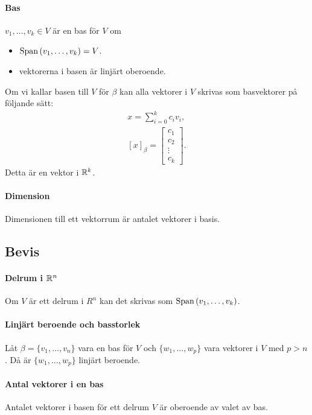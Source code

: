 \paragraph{Bas}
$v_1, \dots, v_k\in V$ är en bas för $V$ om
\begin{itemize}
	\item $\text{Span}\left(v_1, \dots, v_k\right) = V$.
	\item vektorerna i basen är linjärt oberoende.
\end{itemize}
Om vi kallar basen till $V$ för $\beta$ kan alla vektorer i $V$ skrivas som basvektorer på följande sätt:
\begin{align*}
	x = \sum\limits_{i = 0}^{k}c_iv_i, \\
	[x]_\beta =
	\left[\begin{array}{c}
		c_1 \\
		c_2 \\
		\vdots \\
		c_k
	\end{array}\right].
\end{align*}
Detta är en vektor i $\mathbb{R}^k$.

\paragraph{Dimension}
Dimensionen till ett vektorrum är antalet vektorer i basis.

\subsection{Bevis}

\paragraph{Delrum i $\mathbb{R}^n$}
Om $V$ är ett delrum i $R^n$ kan det skrivas som $\text{Span}\left(v_1, \dots, v_k\right)$.

\proof

\paragraph{Linjärt beroende och basstorlek}
Låt $\beta = \{v_1, \dots, v_n\}$ vara en bas för $V$ och $\{w_1, \dots, w_p\}$ vara vektorer i $V$ med $p > n$. Då är $\{w_1, \dots, w_p\}$ linjärt beroende.

\proof

\paragraph{Antal vektorer i en bas}
Antalet vektorer i basen för ett delrum $V$ är oberoende av valet av bas.

